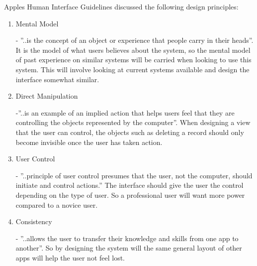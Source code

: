 Apples Human Interface Guidelines \cite{guidelines} discussed the following design principles:

\begin{enumerate}
  \item Mental Model 
  
  - ''..is the concept of an object or experience that people carry in their heads''. It is the model of what users believes about the system, so the mental model of past experience on similar systems will be carried when looking to use this system. This will involve looking at current systems available and design the interface somewhat similar.
  
  \item Direct Manipulation
  
  -''..is an example of an implied action that helps users feel that they are controlling the objects represented by the computer''. When designing a view that the user can control, the objects such as deleting a record should only become invisible once the user has taken action.
  
  \item User Control 
  
  - ''..principle of user control presumes that the user, not the computer, should initiate and control actions.'' The interface should give the user the control depending on the type of user. So a professional user will want more power compared to a novice user.
  
  \item Consistency
  
  - ''..allows the user to transfer their knowledge and skills from one app to another''. So by designing the system will the same general layout of other apps will help the user not feel lost.
  
\end{enumerate}